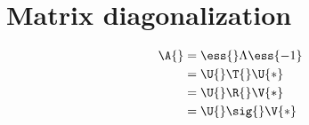 \section{Matrix diagonalization}

\begin{equation}
  \begin{split}
    \A{} 
      &= \ess{} \Lambda \ess{-1} \\
      &= \U{} \T{} \U{*} \\
      &= \U{} \R{} \V{*} \\
      &= \U{} \sig{} \V{*}
  \end{split}
\end{equation}
\endinput